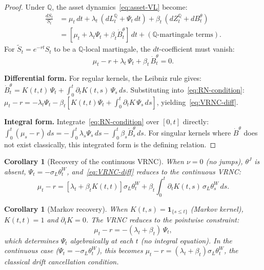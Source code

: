 \documentclass[11pt,a4paper]{article}
\theoremstyle{plain}
\newtheorem{corollary}[theorem]{Corollary}
\theoremstyle{definition}
\theoremstyle{remark}
\newcommand{\QQ}{\mathbb{Q}}
\begin{document}
\begin{proof}
Under $\QQ$, the asset dynamics~\eqref{eq:asset-VL} become:
\begin{align*}
  \frac{dS_t}{S_t}
  &= \mu_t\,dt + \lambda_t\,(dL_t^\QQ + \Psi_t\,dt)
  + \beta_t\,(dZ_t^\QQ + dB_t^\theta)\\
  &= [\mu_t + \lambda_t\Psi_t + \beta_t\dot{B}_t^\theta]\,dt
  + (\text{$\QQ$-martingale terms}).
\end{align*}
For $\tilde{S}_t = e^{-rt}S_t$ to be a $\QQ$-local martingale,
the $dt$-coefficient must vanish:
\begin{equation}\label{eq:RN-condition}
  \mu_t - r + \lambda_t\,\Psi_t + \beta_t\,\dot{B}_t^\theta = 0.
\end{equation}

\textbf{Differential form.}  For regular kernels, the Leibniz rule
gives:
$\dot{B}_t^\theta = K(t,t)\,\Psi_t + \int_0^t \partial_t K(t,s)\,
\Psi_s\,ds$.
Substituting into~\eqref{eq:RN-condition}:
$\mu_t - r = -\lambda_t\Psi_t - \beta_t[K(t,t)\Psi_t
+ \int_0^t\partial_t K\,\Psi_s\,ds]$,
yielding~\eqref{eq:VRNC-diff}.

\textbf{Integral form.}  Integrate~\eqref{eq:RN-condition} over
$[0,t]$ directly:
$\int_0^t(\mu_s - r)\,ds = -\int_0^t \lambda_s\Psi_s\,ds
- \int_0^t \beta_s\dot{B}_s^\theta\,ds$.
For singular kernels where $\dot{B}^\theta$ does not exist
classically, this integrated form is the defining relation.
\end{proof}

\begin{corollary}[Recovery of the continuous VRNC]
\label{cor:VRNC-recovery}
When $\nu = 0$ (no jumps), $\theta^J$ is absent,
$\Psi_t = -\sigma_L\theta_t^W$, and~\eqref{eq:VRNC-diff}
reduces to the continuous
VRNC:
\[
  \mu_t - r = [\lambda_t + \beta_t K(t,t)]\sigma_L\theta_t^W
  + \beta_t\int_0^t \partial_t K(t,s)\,\sigma_L\theta_s^W\,ds.
\]
\end{corollary}

\begin{corollary}[Markov recovery]\label{cor:VRNC-markov}
When $K(t,s) = \mathbf{1}_{\{s \leq t\}}$ (Markov kernel),
$K(t,t) = 1$ and $\partial_t K = 0$.  The VRNC reduces to
the \emph{pointwise} constraint:
\[
  \mu_t - r = -(\lambda_t + \beta_t)\,\Psi_t,
\]
which determines $\Psi_t$ algebraically at each $t$ (no integral
equation).  In the continuous case ($\Psi_t = -\sigma_L\theta_t^W$),
this becomes $\mu_t - r = (\lambda_t + \beta_t)\sigma_L\theta_t^W$,
the classical drift cancellation condition.
\end{corollary}
\end{document}
